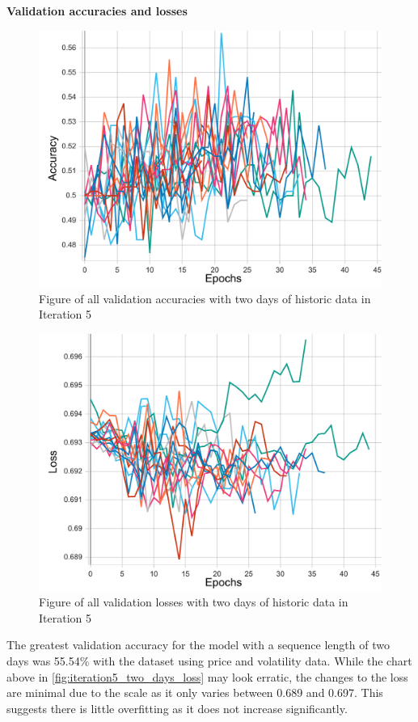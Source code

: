 \pagebreak
\textbf{Validation accuracies and losses}
\begin{figure}[ht]
    \centering
    \includegraphics[width=0.575\columnwidth]{figures/results/final/two_days_acc.pdf}
    \caption[Validation accuracies for Iteration 5 with two days of historic data]{Figure of all validation accuracies with two days of historic data in Iteration 5}
    \label{fig:iteration5_two_days_accuracy}
\end{figure}
\FloatBarrier

\begin{figure}[ht]
    \centering
    \includegraphics[width=0.575\columnwidth]{figures/results/final/two_days_loss.pdf}
    \caption[Validation losses for Iteration 5 with two days of historic data]{Figure of all validation losses with two days of historic data in Iteration 5}
    \label{fig:iteration5_two_days_loss}
\end{figure}
\FloatBarrier

The greatest validation accuracy for the model with a sequence length of two days was 55.54\% with the dataset using price and volatility data.
While the chart above in \autoref{fig:iteration5_two_days_loss} may look erratic, the changes to the loss are minimal due to the scale as it only varies
between 0.689 and 0.697. This suggests there is little overfitting as it does not increase significantly.

\pagebreak

